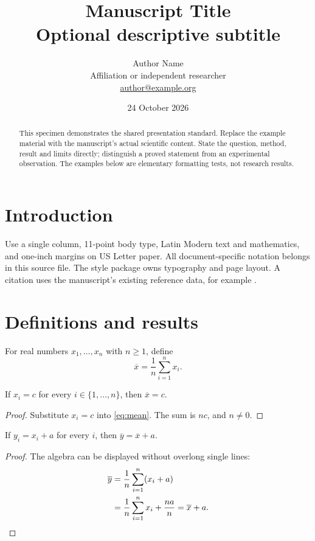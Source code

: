 \documentclass[11pt,letterpaper]{article}
\title{Manuscript Title\\[4pt]{\large\normalfont\color{black}Optional descriptive subtitle}}
\author{Author Name\\\small Affiliation or independent researcher\\
  \small\href{mailto:author@example.org}{author@example.org}}
\date{24 October 2026\\[6pt]
  \PublicationLinks{https://example.org/report/}{https://github.com/example/project}}
\begin{document}
\maketitle
\begin{abstract}
This specimen demonstrates the shared presentation standard. Replace the example
material with the manuscript's actual scientific content. State the question,
method, result and limits directly; distinguish a proved statement from an
experimental observation. The examples below are elementary formatting tests,
not research results.
\end{abstract}

\section{Introduction}
\label{sec:introduction}
Use a single column, 11-point body type, Latin Modern text and mathematics, and
one-inch margins on US Letter paper. All document-specific notation belongs in
this source file. The style package owns typography and page layout. A citation
uses the manuscript's existing reference data, for example \citet{lamport}.

\section{Definitions and results}
\label{sec:results}
\begin{definition}
For real numbers $x_1,\ldots,x_n$ with $n\geq1$, define
\begin{equation}
  \overline{x}=\frac{1}{n}\sum_{i=1}^{n}x_i.
  \label{eq:mean}
\end{equation}
\end{definition}

\begin{lemma}
\label{lem:constant}
If $x_i=c$ for every $i\in\{1,\ldots,n\}$, then $\overline{x}=c$.
\end{lemma}
\begin{proof}
Substitute $x_i=c$ into \eqref{eq:mean}. The sum is $nc$, and $n\ne0$.
\end{proof}

\begin{theorem}
\label{thm:translation}
If $y_i=x_i+a$ for every $i$, then $\overline{y}=\overline{x}+a$.
\end{theorem}
\begin{proof}
The algebra can be displayed without overlong single lines:
\begin{align*}
\overline{y}
  &=\frac{1}{n}\sum_{i=1}^{n}(x_i+a)\\
  &=\frac{1}{n}\sum_{i=1}^{n}x_i+\frac{na}{n}
   =\overline{x}+a.\qedhere
\end{align*}
\end{proof}
\end{document}

